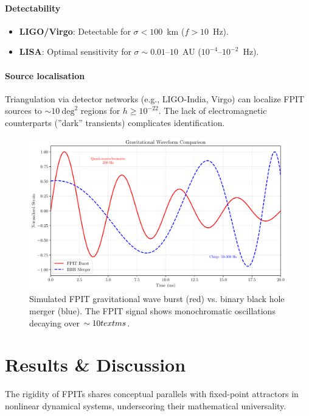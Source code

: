 \documentclass[twocolumn]{article}
\begin{document}
	\paragraph{Detectability}
	\begin{itemize}
		\item \textbf{LIGO/Virgo}: Detectable for $\sigma < 100$~km ($f > 10$~Hz)\cite{ligo2015}.  
		\item \textbf{LISA}: Optimal sensitivity for $\sigma \sim 0.01\text{--}10$~AU ($10^{-4}\text{--}10^{-2}$~Hz)\cite{robson2019}.  
	\end{itemize}
	
	\paragraph{Source localisation}
	Triangulation via detector networks (e.g., LIGO-India, Virgo) can localize FPIT sources to \(\sim\!10~\text{deg}^2\) regions for \(h \geq 10^{-22}\). The lack of electromagnetic counterparts (''dark'' transients) complicates identification.
	
	\begin{figure}[htbp]  
		\centering
		\captionsetup{font=large}
		\includegraphics[width=0.8\linewidth]{figures/gw_waveform.pdf}
		\caption{Simulated FPIT gravitational wave burst (red) vs. binary black hole merger (blue). The FPIT signal shows monochromatic oscillations decaying over \(\sim 10\\text{ms}\).}
\label{fig:gw_waveform}
	\end{figure}
	
	
	
	\FloatBarrier%
	\section{Results \& Discussion}\label{sec:discussion}
	The rigidity of FPITs shares conceptual parallels with fixed-point attractors in nonlinear dynamical systems, underscoring their mathematical universality.
	
\end{document}
